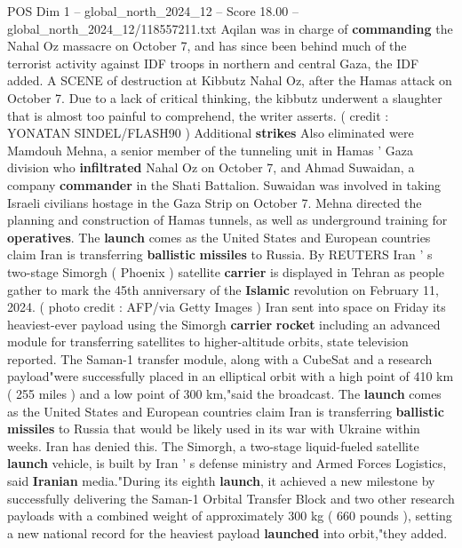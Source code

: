 \begin{textsample}{POS Dim 1 – global\_north\_2024\_12 – Score 18.00 – global\_north\_2024\_12/118557211.txt}  \label{ex:f1_pos_270}
Aqilan was in charge of \textbf{commanding} the Nahal Oz massacre on October 7, and has since been behind much of the terrorist activity against IDF troops in northern and central Gaza, the IDF added.
A SCENE of destruction at Kibbutz Nahal Oz, after the Hamas attack on October 7.
Due to a lack of critical thinking, the kibbutz underwent a slaughter that is almost too painful to comprehend, the writer asserts. ( credit : YONATAN SINDEL/FLASH90 ) Additional \textbf{strikes} Also eliminated were Mamdouh Mehna, a senior member of the tunneling unit in Hamas ' Gaza division who \textbf{infiltrated} Nahal Oz on October 7, and Ahmad Suwaidan, a company \textbf{commander} in the Shati Battalion.
Suwaidan was involved in taking Israeli civilians hostage in the Gaza Strip on October 7.
Mehna directed the planning and construction of Hamas tunnels, as well as underground training for \textbf{operatives}.
The \textbf{launch} comes as the United States and European countries claim Iran is transferring \textbf{ballistic} \textbf{missiles} to Russia.
By REUTERS Iran ' s two-stage Simorgh ( Phoenix ) satellite \textbf{carrier} is displayed in Tehran as people gather to mark the 45th anniversary of the \textbf{Islamic} revolution on February 11, 2024. ( photo credit : AFP/via Getty Images ) Iran sent into space on Friday its heaviest-ever payload using the Simorgh \textbf{carrier} \textbf{rocket} including an advanced module for transferring satellites to higher-altitude orbits, state television reported.
The Saman-1 transfer module, along with a CubeSat and a research payload"were successfully placed in an elliptical orbit with a high point of 410 km ( 255 miles ) and a low point of 300 km,"said the broadcast.
The \textbf{launch} comes as the United States and European countries claim Iran is transferring \textbf{ballistic} \textbf{missiles} to Russia that would be likely used in its war with Ukraine within weeks.
Iran has denied this.
The Simorgh, a two-stage liquid-fueled satellite \textbf{launch} vehicle, is built by Iran ' s defense ministry and Armed Forces Logistics, said \textbf{Iranian} media."During its eighth \textbf{launch}, it achieved a new milestone by successfully delivering the Saman-1 Orbital Transfer Block and two other research payloads with a combined weight of approximately 300 kg ( 660 pounds ), setting a new national record for the heaviest payload \textbf{launched} into orbit,"they added.

\end{textsample}
